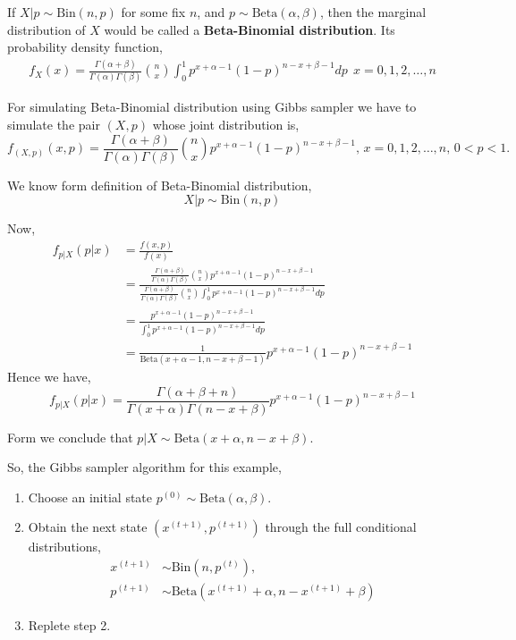 \begin{example}

    If $ X|p \sim \text{Bin}(n,p)$ for some fix $ n $, and $ p \sim \text{Beta}(\alpha,\beta) $, then the marginal distribution of $ X $ would be called a \textbf{Beta-Binomial distribution}.
    Its probability density function,
    \begin{align*}
        f_X(x) = \frac{\Gamma(\alpha+\beta)}{\Gamma(\alpha)\Gamma(\beta)} {n\choose x} \int_{0}^{1} p^{x + \alpha -1}(1-p)^{n - x + \beta -1}dp \ \ x = 0,1,2,\ldots,n  
    \end{align*}

    For simulating Beta-Binomial distribution using Gibbs sampler we have to simulate the pair $ (X,p) $ whose joint distribution is,
    \[
       f_{(X,p)}(x,p) = \frac{\Gamma(\alpha+\beta)}{\Gamma(\alpha)\Gamma(\beta)} {n\choose x} p^{x + \alpha -1}(1-p)^{n - x + \beta -1} , \, x = 0,1,2,\ldots,n, \, 0<p<1.  
    \]
    
    We know form definition of Beta-Binomial distribution,
    \[
        X|p \sim \text{Bin}(n,p)
    \]

    Now,
    \begin{align*}
        f_{p|X}(p|x) &= \frac{f(x,p)}{f(x)} \\ 
                &= \frac{ \frac{\Gamma(\alpha+\beta)}{\Gamma(\alpha)\Gamma(\beta)} {n\choose x} p^{x + \alpha -1}(1-p)^{n - x + \beta -1} }{ \frac{\Gamma(\alpha+\beta)}{\Gamma(\alpha)\Gamma(\beta)} {n\choose x} \int_{0}^{1} p^{x + \alpha -1}(1-p)^{n - x + \beta -1}dp } \\
                &= \frac{ p^{x + \alpha -1}(1-p)^{n - x + \beta -1} }{ \int_{0}^{1} p^{x + \alpha -1}(1-p)^{n - x + \beta -1}dp } \\
                &= \frac{ 1 }{ \text{Beta}(x+\alpha-1,n-x+\beta-1) } p^{x + \alpha -1}(1-p)^{n - x + \beta -1}
    \end{align*}
    Hence we have,
    \begin{equation}
        \label{eq:p|x}
        f_{p|X}(p|x) = \frac{\Gamma(\alpha+\beta+n)}{\Gamma(x+\alpha)\Gamma(n-x+\beta)} p^{x + \alpha -1}(1-p)^{n - x + \beta -1}
    \end{equation}

    Form  we conclude that $ p|X\sim \text{Beta}(x+\alpha,n-x+\beta) $.

    So, the Gibbs sampler algorithm for this example,
    \begin{enumerate}
        \item Choose an initial state $ p^{(0)} \sim \text{Beta}(\alpha,\beta)  $.
        \item Obtain the next state $ \left(x^{(t+1)}, p^{(t+1)}\right) $ through the full conditional distributions,
            \begin{align*}
                x^{(t+1)} &\sim \text{Bin}\left( n,p^{(t)} \right),\\
                p^{(t+1)} &\sim \text{Beta}\left(x^{(t+1)}+\alpha, n-x^{(t+1)}+\beta \right) 
            \end{align*}
        \item Replete step 2.  
    \end{enumerate}


\end{example}
